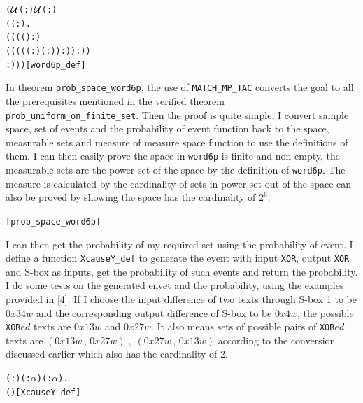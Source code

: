 \documentclass{article}
\begin{document}
\begin{alltt}
  \HOLTokenTurnstile{}  \HOLSymConst{=}
   (\ensuremath{{\cal{U}}}(:)\HOLSymConst{,} \ensuremath{{\cal{U}}}(:)\HOLSymConst{,}
    (\HOLTokenLambda{}( : \HOLTokenMap{} ).
         ((((\HOLSymConst{\&} ) :) \HOLSymConst{/}
           ((\HOLSymConst{\&}((( :) \HOLSymConst{\HOLTokenExp{}} ( :)) :)) :))
            :)))\hfill{[word6p_def]}
\end{alltt}

In theorem \verb|prob_space_word6p|, the use of \verb|MATCH_MP_TAC| converts the goal to all the prerequisites mentioned in the
verified theorem \verb|prob_uniform_on_finite_set|. Then the proof is quite simple, I convert sample space, set of events
and the probability of event function back to the space, measurable sets and measure of measure space function to use the
definitions of them. I can then easily prove the space in \verb|word6p| is finite and non-empty, the measurable sets are the power
set of the space by the definition of \verb|word6p|.  The measure is calculated by the cardinality of sets in power set
out of the space can also be proved by showing the space has the cardinality of $2^6$.

\begin{alltt}
  \HOLTokenTurnstile{}  \hfill{[prob_space_word6p]}
\end{alltt}

I can then get the probability of my required set using the probability of event. I define a
function \verb|XcauseY_def| to generate the event with input \verb|XOR|, output \verb|XOR| and S-box as inputs, get the
probability of such events and return the probability. I do some tests on the generated envet
and the probability, using the examples provided in [4]. If I choose the input difference of two texts through
S-box 1 to be $0x34w$ and the corresponding output difference of S-box to be $0x4w$, the possible \verb|XOR|$ed$ texts are
$0x13w$ and $0x27w$. It also means sets of possible pairs of \verb|XOR|$ed$ texts are
${(0x13w\,,\, 0x27w)\;,\;(0x27w\,,\,0x13w)}$
according to the conversion discussed earlier which also has the cardinality of 2.

\begin{alltt}
  \HOLTokenTurnstile{} \HOLSymConst{\HOLTokenForall{}}( :) ( :\ensuremath{\alpha} ) ( : \HOLTokenMap{} \ensuremath{\alpha} ).
         \HOLSymConst{=}   \HOLTokenLeftbrace{} \HOLTokenBar{}   \HOLSymConst{\HOLTokenEor{}}  ( \HOLSymConst{\HOLTokenEor{}} ) \HOLSymConst{=} \HOLTokenRightbrace{}\hfill{[XcauseY_def]}
\end{alltt}
\end{document}
